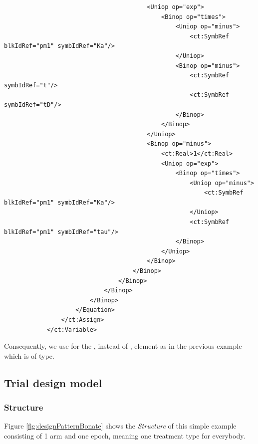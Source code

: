 \begin{lstlisting}
                                        <Uniop op="exp">
                                            <Binop op="times">
                                                <Uniop op="minus">
                                                    <ct:SymbRef blkIdRef="pm1" symbIdRef="Ka"/>
                                                </Uniop>
                                                <Binop op="minus">
                                                    <ct:SymbRef symbIdRef="t"/>
                                                    <ct:SymbRef symbIdRef="tD"/>                                                    
                                                </Binop>
                                            </Binop>
                                        </Uniop>
                                        <Binop op="minus">
                                            <ct:Real>1</ct:Real>
                                            <Uniop op="exp">
                                                <Binop op="times">
                                                    <Uniop op="minus">
                                                        <ct:SymbRef blkIdRef="pm1" symbIdRef="Ka"/>
                                                    </Uniop>
                                                    <ct:SymbRef blkIdRef="pm1" symbIdRef="tau"/>
                                                </Binop>
                                            </Uniop>
                                        </Binop>
                                    </Binop>
                                </Binop>
                            </Binop>
                        </Binop>
                    </Equation>
                </ct:Assign>
            </ct:Variable>
\end{lstlisting}

Consequently, we use for  the , instead of ,
element as in the previous example which is of  type.

\subsection{Trial design model}
\subsubsection{Structure}

Figure \ref{fig:designPatternBonate} shows the \textit{Structure} of
this simple example consisting of 1 arm and one epoch, meaning one treatment
type for everybody.

